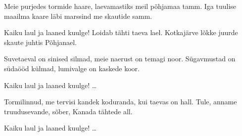 Meie purjedes tormide haare,
laevamastiks meil p\~ohjamaa tamm.
Iga tuulise maailma kaare
l\"abi marssind me skautide samm.

Kaiku laul ja laaned kuulge!
Loidab t\"ahti taeva lael.
Kotkaj\"arve l\~okke juurde
skaute juhtis P\~ohjanael.

Suvetaeval on sinised silmad,
meie naerust on temagi noor.
S\"ugavmustad on s\"uda\"o\"od k\"ulmad,
lumivalge on kaskede koor.

Kaiku laul ja laaned kuulge! \ldots

Tormilinnud, me tervisi kandek
koduranda, kui taevas on hall.
Tule, anname truudusevande,
s\~ober, Kanada t\"ahtede all.

Kaiku laul ja laaned kuulge! \ldots
